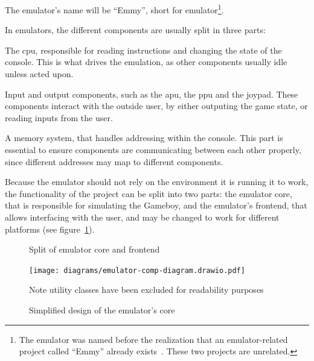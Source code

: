 \documentclass[11pt]{informatics-report}
\begin{document}
The emulator's name will be ``Emmy'', short for emulator\footnote{The emulator was named before the realization that an emulator-related project called ``Emmy'' already exists~\cite{emmy_stanford}. These two projects are unrelated.}. 

In emulators, the different components are usually split in three parts:
\begin{compactitem}
	\item The \gls{cpu}, responsible for reading instructions and changing the state of the console. This is what drives the emulation, as other components usually idle unless acted upon.
	\item Input and output components, such as the \gls{apu}, the \gls{ppu} and the joypad. These components interact with the outside user, by either outputing the game state, or reading inputs from the user.
	\item A memory system, that handles addressing within the console. This part is essential to ensure components are communicating between each other properly, since different addresses may map to different components.
\end{compactitem}

Because the emulator should not rely on the environment it is running it to work, the functionality of the project can be split into two parts: the emulator core, that is responsible for simulating the Gameboy, and the emulator's frontend, that allows interfacing with the user, and may be changed to work for different platforms (see figure~\ref{fig:emu-back-front-split-uml}).

\begin{figure}[h]
    \centering
    \caption{Split of emulator core and frontend}
    \label{fig:emu-back-front-split-uml}
\end{figure}

\begin{figure}[h]
    \centering
    \texttt{[image: diagrams/emulator-comp-diagram.drawio.pdf]}
    \caption{Simplified design of the emulator's core}
    Note utility classes have been excluded for readability purposes
    \label{fig:emu-core-components}
\end{figure}
\end{document}
